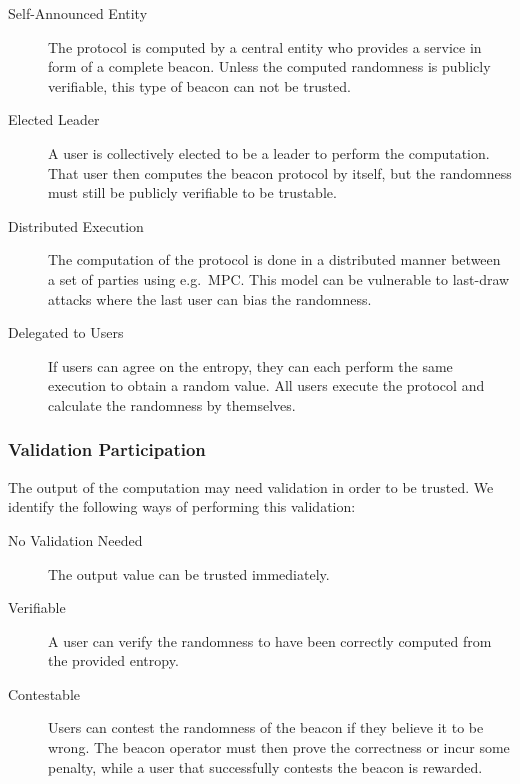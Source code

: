 \begin{description}
    \item[Self-Announced Entity] The protocol is computed by a central entity who provides a service in form of a complete beacon. Unless the computed randomness is publicly verifiable, this type of beacon can not be trusted. 
    \item[Elected Leader] A user is collectively elected to be a leader to perform the computation. That user then computes the beacon protocol by itself, but the randomness must still be publicly verifiable to be trustable. 
    \item[Distributed Execution]
    The computation of the protocol is done in a distributed manner between a set of parties using e.g.\ MPC\@. This model can be vulnerable to last-draw attacks where the last user can bias the randomness. 
    \item[Delegated to Users] If users can agree on the entropy, they can each perform the same execution to obtain a random value. All users execute the protocol and calculate the randomness by themselves. 
\end{description}

\subsubsection{Validation Participation}
The output of the computation may need validation in order to be trusted. We identify the following ways of performing this validation:
\begin{description}
    \item[No Validation Needed] The output value can be trusted immediately. 
    \item [Verifiable] A user can verify the randomness to have been correctly computed from the provided entropy. 
    \item [Contestable] Users can contest the randomness of the beacon if they believe it to be wrong. The beacon operator must then prove the correctness or incur some penalty, while a user that successfully contests the beacon is rewarded.
\end{description}
